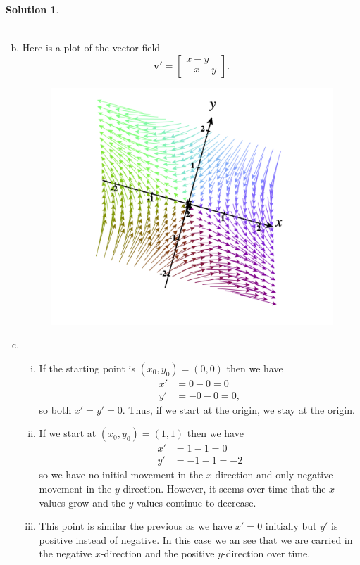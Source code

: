 \documentclass[12pt]{report} %
\theoremstyle{definition}
\newtheorem{solution}{Solution}
\begin{document}
\begin{solution}
\begin{enumerate}[(a)]
\begin{align*}
    \end{align*}
    \item Here is a plot of the vector field
    \[
    \mathbf{v}' = \begin{bmatrix} x-y\\ -x-y \end{bmatrix}.
    \]
    \begin{figure}[H]
        \centering
        \includegraphics[width=.7\textwidth]{Images/linear_system_vfield.png}
    \end{figure}
    \item ~
    \begin{enumerate}[i.]
        \item If the starting point is $(x_0,y_0)=(0,0)$ then we have
        \begin{align*}
            x' &= 0-0 = 0\\
            y' &= -0-0=0,
        \end{align*}
        so both $x'=y'=0$. Thus, if we start at the origin, we stay at the origin.
        \item If we start at $(x_0,y_0)=(1,1)$ then we have
        \begin{align*}
            x' &= 1-1 = 0\\
            y' &= -1 -1 = -2
        \end{align*}
        so we have no initial movement in the $x$-direction and only negative movement in the $y$-direction. However, it seems over time that the $x$-values grow and the $y$-values continue to decrease.
        
        \item This point is similar the previous as we have $x' =0$ initially but $y'$ is positive instead of negative.  In this case we an see that we are carried in the negative $x$-direction and the positive $y$-direction over time.
    \end{enumerate}
\end{enumerate}
\end{solution}
\vspace*{.5cm}
\end{document}
